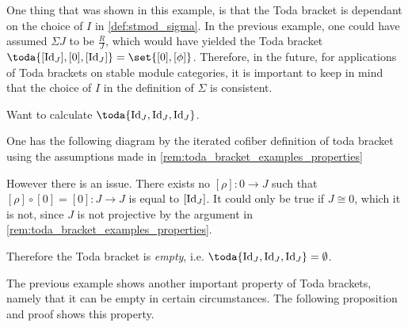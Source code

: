 One thing that was shown in this example, is that the Toda bracket is dependant on the choice of \( I \) in \autoref{def:stmod_sigma}. In the previous example, one could have assumed \( \Sigma J \) to be \( \frac{R}{J} \), which would have yielded the Toda bracket \( \toda{[\Id_J], [0], [\Id_J]} = \set{[0], [\phi]} \). Therefore, in the future, for applications of Toda brackets on stable module categories, it is important to keep in mind that the choice of \( I \) in the definition of \( \Sigma \) is consistent.

\begin{example}
	\label{ex:toda_bracket-1}
	Want to calculate \( \toda{\Id_J, \Id_J, \Id_J} \).

	One has the following diagram by the iterated cofiber definition of toda bracket using the assumptions made in \autoref{rem:toda_bracket_examples_properties}
	\begin{center}
	\end{center}

	However there is an issue. There exists no \( [\rho]: 0 \to J \) such that \( [\rho] \circ [0] = [0]: J \to J \) is equal to \( [\operatorname{Id}_J] \). It could only be true if \( J \cong 0 \), which it is not, since \( J \) is not projective by the argument in \autoref{rem:toda_bracket_examples_properties}.

	Therefore the Toda bracket is \emph{empty}, i.e. \( \toda{\Id_J, \Id_J, \Id_J} = \emptyset \).
\end{example}

The previous example shows another important property of Toda brackets, namely that it can be empty in certain circumstances. The following proposition and proof shows this property.

